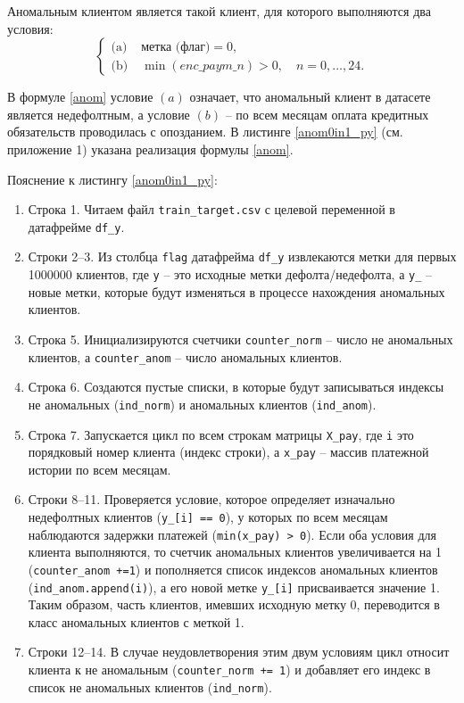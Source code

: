 {\df Аномальным клиентом является такой клиент, для которого выполняются два условия:
\begin{equation}
\left\{
\begin{aligned}
\text{(a)}\;& \text{метка (флаг)} = 0, \\
\text{(b)}\;& \min(enc\_paym\_n) > 0,\quad n = 0,\ldots,24.
\end{aligned}
\right.
\tag{$anom$}
\label{anom}
\end{equation}
}

В формуле \eqref{anom} условие $(a)$ означает, что аномальный клиент в датасете является недефолтным, а условие $(b)$ -- по всем месяцам оплата кредитных обязательств проводилась с опозданием. В листинге \ref{anom0in1_py} (см. приложение 1) указана реализация формулы \ref{anom}. 

{\co Пояснение к листингу \ref{anom0in1_py}:} 
	\begin{enumerate}[nosep]
		\item Строка 1. Читаем файл \texttt{train\_target.csv} с целевой переменной в датафрейме \texttt{df\_y}. 
		\item Строки 2--3. Из столбца \texttt{flag} датафрейма \texttt{df\_y} извлекаются метки для первых 1000000 клиентов, где \texttt{y} -- это исходные метки дефолта/недефолта, а \texttt{y\_} -- новые метки, которые будут изменяться в процессе нахождения аномальных клиентов. 
		\item Строка 5. Инициализируются счетчики \texttt{counter\_norm} -- число не аномальных клиентов, а \texttt{counter\_anom} -- число аномальных клиентов.
		\item Строка 6. Создаются пустые списки, в которые будут записываться индексы не аномальных (\texttt{ind\_norm}) и аномальных клиентов (\texttt{ind\_anom}).
		\item Строка 7. Запускается цикл по всем строкам матрицы \texttt{X\_pay}, где \texttt{i} это порядковый номер клиента (индекс строки), а \texttt{x\_pay} -- массив платежной истории по всем месяцам.
		\item Строки 8--11. Проверяется условие, которое определяет изначально недефолтных клиентов (\texttt{y\_[i] == 0}), у которых по всем месяцам наблюдаются задержки платежей (\texttt{min(x\_pay) > 0}). Если оба условия для клиента выполняются, то счетчик аномальных клиентов увеличивается на 1 (\texttt{counter\_anom +=1}) и пополняется список индексов аномальных клиентов (\texttt{ind\_anom.append(i)}), а его новой метке \texttt{y\_[i]} присваивается значение 1. Таким образом, часть клиентов, имевших исходную метку 0, переводится в класс аномальных клиентов с меткой 1. 
		\item Строки 12--14. В случае неудовлетворения этим двум условиям цикл относит клиента к не аномальным (\texttt{counter\_norm += 1}) и добавляет его индекс в список не аномальных клиентов (\texttt{ind\_norm}).
	\end{enumerate}
	

